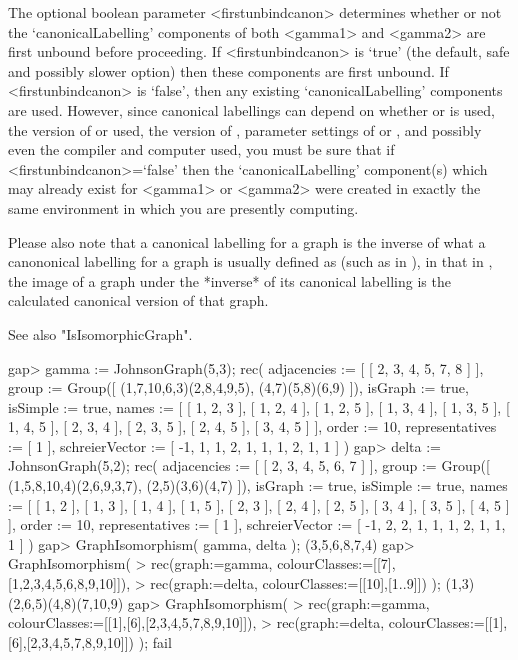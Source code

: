 The optional boolean parameter <firstunbindcanon> determines whether or
not the `canonicalLabelling' components of both <gamma1> and <gamma2>
are first unbound before proceeding.  If <firstunbindcanon> is `true'
(the default, safe and possibly slower option) then these components
are first unbound.  If <firstunbindcanon> is `false', then any existing
`canonicalLabelling' components are used.  However, since canonical
labellings can depend on whether {\nauty} or {\bliss} is used, the version
of {\nauty} or {\bliss} used, the version of {\GRAPE}, parameter settings
of {\nauty} or {\bliss}, and possibly even the compiler and computer
used, you must be sure that if <firstunbindcanon>=`false' then the
`canonicalLabelling' component(s) which may already exist for <gamma1>
or <gamma2> were created in exactly the same environment in which you
are presently computing.

Please also note that a canonical labelling for a {\GRAPE} graph is the
inverse of what a canononical labelling for a graph is usually defined as
(such as in {\bliss}), in that in {\GRAPE}, the image of a graph under
the *inverse* of its canonical labelling is the calculated canonical
version of that graph.

See also "IsIsomorphicGraph".

\beginexample
gap> gamma := JohnsonGraph(5,3);
rec( adjacencies := [ [ 2, 3, 4, 5, 7, 8 ] ], 
  group := Group([ (1,7,10,6,3)(2,8,4,9,5), (4,7)(5,8)(6,9) ]), 
  isGraph := true, isSimple := true, 
  names := [ [ 1, 2, 3 ], [ 1, 2, 4 ], [ 1, 2, 5 ], [ 1, 3, 4 ], [ 1, 3, 5 ], 
      [ 1, 4, 5 ], [ 2, 3, 4 ], [ 2, 3, 5 ], [ 2, 4, 5 ], [ 3, 4, 5 ] ], 
  order := 10, representatives := [ 1 ], 
  schreierVector := [ -1, 1, 1, 2, 1, 1, 1, 2, 1, 1 ] )
gap> delta := JohnsonGraph(5,2);
rec( adjacencies := [ [ 2, 3, 4, 5, 6, 7 ] ], 
  group := Group([ (1,5,8,10,4)(2,6,9,3,7), (2,5)(3,6)(4,7) ]), 
  isGraph := true, isSimple := true, 
  names := [ [ 1, 2 ], [ 1, 3 ], [ 1, 4 ], [ 1, 5 ], [ 2, 3 ], [ 2, 4 ], 
      [ 2, 5 ], [ 3, 4 ], [ 3, 5 ], [ 4, 5 ] ], order := 10, 
  representatives := [ 1 ], schreierVector := [ -1, 2, 2, 1, 1, 1, 2, 1, 1, 1 
     ] )
gap> GraphIsomorphism( gamma, delta );
(3,5,6,8,7,4)
gap> GraphIsomorphism( 
>       rec(graph:=gamma, colourClasses:=[[7],[1,2,3,4,5,6,8,9,10]]), 
>       rec(graph:=delta, colourClasses:=[[10],[1..9]]) ); 
(1,3)(2,6,5)(4,8)(7,10,9)
gap> GraphIsomorphism( 
>       rec(graph:=gamma, colourClasses:=[[1],[6],[2,3,4,5,7,8,9,10]]), 
>       rec(graph:=delta, colourClasses:=[[1],[6],[2,3,4,5,7,8,9,10]]) ); 
fail
\endexample

